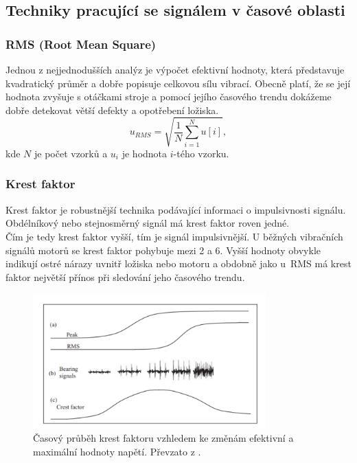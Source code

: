 \subsection{Techniky pracující se signálem v časové oblasti}
    
    \subsubsection{RMS (Root Mean Square)}
    Jednou z nejjednodušších analýz je výpočet efektivní hodnoty, která představuje kvadratický průměr a dobře popisuje celkovou sílu vibrací. Obecně platí, že se její hodnota zvyšuje s otáčkami stroje a pomocí jejího časového trendu dokážeme dobře detekovat větší defekty a opotřebení ložiska.
    \begin{equation}
        u_{RMS} = \sqrt{\frac{1}{N}\sum_{i=1}^{N} u[i]}, 
    \end{equation}
    kde $N$ je počet vzorků a $u_i$ je hodnota $i$-tého vzorku.
    
    
     \subsubsection{Krest faktor}
     \label{section:krest}
        Krest faktor je robustnější technika podávající informaci o impulsivnosti signálu. Obdélníkový nebo stejnosměrný signál má krest faktor roven jedné.\\
        Čím je tedy krest faktor vyšší, tím je signál impulsivnější. U běžných vibračních signálů motorů se krest faktor pohybuje mezi 2 a 6. Vyšší hodnoty obvykle indikují ostré nárazy uvnitř ložiska nebo motoru a obdobně jako u~RMS má krest faktor největší přínos při sledování jeho časového trendu.
        \begin{figure} [!h]
            \centering
            \caption{Časový průběh krest faktoru vzhledem ke změnám efektivní a maximální hodnoty napětí. Převzato z \cite{book:1}.}
            \includegraphics[width=0.8\textwidth]{DSP/Figs/krest_factor.png}
        \end{figure} 
        
